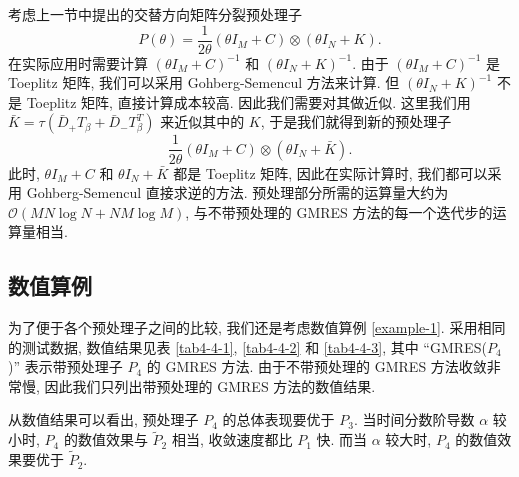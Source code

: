 \documentclass{ecnumaster}
\begin{document}
考虑上一节中提出的交替方向矩阵分裂预处理子 
$$ P(\theta) = \frac{1}{2 \theta} (\theta I_M + C) \otimes (\theta I_N + K). $$
在实际应用时需要计算 $(\theta I_M + C)^{-1}$ 和 $(\theta I_N + K)^{-1}$.
由于 $(\theta I_M + C)^{-1}$ 是 Toeplitz 矩阵, 我们可以采用 
Gohberg-Semencul 方法来计算.
但 $(\theta I_N + K)^{-1}$ 不是 Toeplitz 矩阵, 直接计算成本较高.
因此我们需要对其做近似.
这里我们用 $\bar{K} = \tau (\bar{D}_+ T_{\beta} + \bar{D}_- T_{\beta}^T)$ 
来近似其中的 $K$, 于是我们就得到新的预处理子
$$ \frac{1}{2 \theta} (\theta I_M + C) \otimes (\theta I_N + \bar{K}). $$
此时, $\theta I_M + C$ 和 $\theta I_N + \bar{K}$ 都是 Toeplitz 矩阵,
因此在实际计算时, 我们都可以采用 Gohberg-Semencul 直接求逆的方法.
预处理部分所需的运算量大约为 $\mathcal{O}(MN\log N + NM\log M)$, 
与不带预处理的 GMRES 方法的每一个迭代步的运算量相当.

\subsection{数值算例}
为了便于各个预处理子之间的比较,
我们还是考虑数值算例 \ref{example-1}.
采用相同的测试数据, 数值结果见表 \ref{tab4-4-1}, \ref{tab4-4-2} 和 \ref{tab4-4-3},
其中 “GMRES($P_4$)” 表示带预处理子 $P_4$ 的 GMRES 方法.
由于不带预处理的 GMRES 方法收敛非常慢, 因此我们只列出带预处理的 GMRES 方法的数值结果.

从数值结果可以看出, 预处理子 $P_4$ 的总体表现要优于 $P_3$.
当时间分数阶导数 $\alpha$ 较小时, $P_4$ 的数值效果与 $\tilde{P}_2$ 相当,
收敛速度都比 $P_1$ 快.
而当 $\alpha$ 较大时, $P_4$ 的数值效果要优于 $\tilde{P}_2$.
\end{document}
